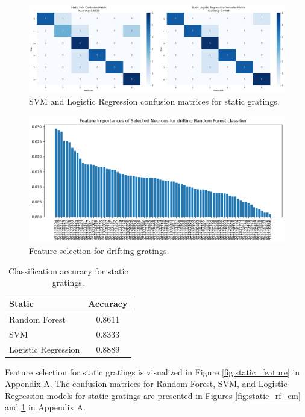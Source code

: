 \documentclass[10pt,twocolumn]{article}
\begin{document}
\begin{figure}[ht]
\centering
\includegraphics[width=\linewidth]{report_images/static_SVM_LogR_confusion_matrix.png}
\caption{SVM and Logistic Regression confusion matrices for static gratings.}
\label{fig:static_svm_logr_cm}
\end{figure}

\begin{figure}[ht]
\centering
\includegraphics[width=\linewidth]{report_images/drifting_feature_selection.png}
\caption{Feature selection for drifting gratings.}
\label{fig:drifting_feature}
\end{figure}


\begin{table}[ht]
  \centering
  \begin{tabular}{l c}
  \hline
  \textbf{Static} & \textbf{Accuracy} \\
  \hline
  Random Forest        & 0.8611 \\
  SVM                  & 0.8333 \\
  Logistic Regression  & 0.8889 \\
  \hline
  \end{tabular}
  \caption{Classification accuracy for static gratings.}
  \label{tab:static_performance}
  \end{table}
    
  Feature selection for static gratings is visualized in Figure \ref{fig:static_feature} in Appendix A. The confusion matrices for Random Forest, SVM, and Logistic Regression models for static gratings are presented in Figures \ref{fig:static_rf_cm} and \ref{fig:static_svm_logr_cm} in Appendix A.
  
\end{document}
